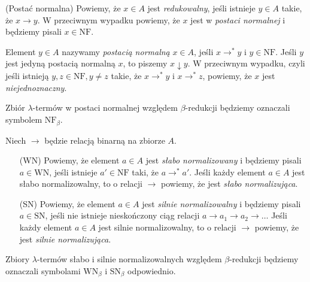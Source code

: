 \begin{definicja}(Postać normalna)\label{def:normalform}
  Powiemy, że \(x\in A\) jest \emph{redukowalny}, jeśli istnieje \(y\in A\) takie, że \(x\to y\). W przeciwnym wypadku powiemy, że \(x\) jest w \emph{postaci normalnej} i będziemy pisali \(x\in\mathrm{NF}\). 
   
  Element \(y\in A\) nazywamy \emph{postacią normalną} \(x\in A\), jeśli \(x\to^{*}y\) i \(y\in\mathrm{NF}\). Jeśli \(y\) jest jedyną postacią normalną \(x\), to piszemy \(x\downarrow y\). W przeciwnym wypadku, czyli jeśli istnieją \(y, z\in \mathrm{NF}, y\neq z\) takie, że \(x\to^{*} y\) i \(x\to^{*} z\), powiemy, że \(x\) jest \emph{niejednoznaczny}. 

\end{definicja}

\begin{uwaga*}
  Zbiór \(\lambda\)-termów w postaci normalnej względem \(\beta\)-redukcji będziemy oznaczali symbolem \(\mathrm{NF}_\beta\).
\end{uwaga*}

\begin{definicja}
  Niech \(\to\) będzie relacją binarną na zbiorze \(A\). 
\begin{enumerate}
  \setlength\itemsep{0em}
  \item[(WN) ] Powiemy, że element \(a\in A\) jest \emph{słabo normalizowany} i będziemy pisali \(a\in \mathrm{WN}\), jeśli
    istnieje \(a'\in \mathrm{NF}\) taki, że \(a\to^{*} a'\). Jeśli każdy element \(a\in A\)
    jest słabo normalizowalny, to o relacji \(\to\) powiemy, że jest
    \emph{słabo normalizująca}.
  \item[(SN)] Powiemy, że element \(a\in A\) jest \emph{silnie normalizowalny}  i będziemy pisali \(a\in \mathrm{SN}\), jeśli nie istnieje nieskończony ciąg relacji \(a \to a_1 \to a_2 \to \dots\) Jeśli każdy element \(a\in A\)
    jest silnie normalizowalny, to o relacji \(\to\) powiemy, że jest \emph{silnie normalizująca}.
\end{enumerate}
\end{definicja}

\begin{uwaga*}
  Zbiory \(\lambda\)-termów słabo i silnie normalizowalnych względem \(\beta\)-redukcji będziemy oznaczali symbolami \(\mathrm{WN}_\beta\) i \(\mathrm{SN}_\beta\) odpowiednio.
\end{uwaga*}

